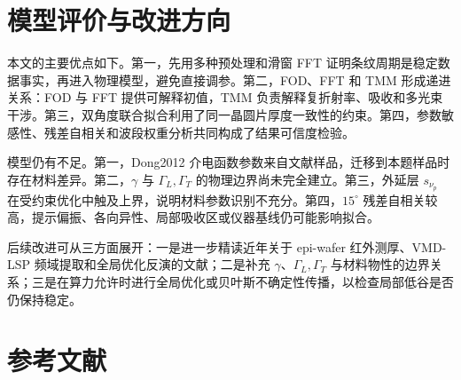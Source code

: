 \documentclass[UTF8,a4paper,12pt]{ctexart}
\begin{document}
\section{模型评价与改进方向}

本文的主要优点如下。第一，先用多种预处理和滑窗 FFT 证明条纹周期是稳定数据事实，再进入物理模型，避免直接调参。第二，FOD、FFT 和 TMM 形成递进关系：FOD 与 FFT 提供可解释初值，TMM 负责解释复折射率、吸收和多光束干涉。第三，双角度联合拟合利用了同一晶圆片厚度一致性的约束。第四，参数敏感性、残差自相关和波段权重分析共同构成了结果可信度检验。

模型仍有不足。第一，Dong2012 介电函数参数来自文献样品，迁移到本题样品时存在材料差异。第二，$\gamma$ 与 $\Gamma_L,\Gamma_T$ 的物理边界尚未完全建立。第三，外延层 $s_{\nu_p}$ 在受约束优化中触及上界，说明材料参数识别不充分。第四，$15^\circ$ 残差自相关较高，提示偏振、各向异性、局部吸收区或仪器基线仍可能影响拟合。

后续改进可从三方面展开：一是进一步精读近年关于 epi-wafer 红外测厚、VMD-LSP 频域提取和全局优化反演的文献；二是补充 $\gamma$、$\Gamma_L,\Gamma_T$ 与材料物性的边界关系；三是在算力允许时进行全局优化或贝叶斯不确定性传播，以检查局部低谷是否仍保持稳定。

\section{参考文献}
\end{document}
